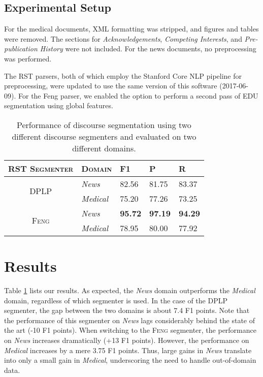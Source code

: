 \subsection{Experimental Setup}
For the medical documents, XML formatting was stripped, and figures and tables were removed. The sections for \textit{Acknowledgements}, \textit{Competing Interests}, and \textit{Pre-publication History} were not included. For the news documents, no preprocessing was performed. 

The RST parsers, both of which employ the Stanford Core NLP pipeline \cite{Manning:2014} for preprocessing, were updated to use the same version of this software (2017-06-09). For the Feng parser, we enabled the option to perform a second pass of EDU segmentation using global features.

\begin{table}[t]
\centering
\begin{tabular}{cllll}
\toprule
\multicolumn{1}{l}{\textsc{RST Segmenter}} & \textsc{Domain}  & \textsc{F1}     & \textsc{P}     & \textsc{R}    \\ \hline \hline
\multirow{2}{*}{\textsc{DPLP}}              & \textit{News}    & 82.56 & 81.75 & 83.37 \\
                                   & \textit{Medical} & 75.20 & 77.26 & 73.25 \\ \hline
\multirow{2}{*}{\textsc{Feng}}              & \textit{News}    & \textbf{95.72} & \textbf{97.19} & \textbf{94.29} \\
                                   & \textit{Medical} & 78.95 &80.00 & 77.92 \\ \bottomrule
\end{tabular}
\caption{Performance of discourse segmentation using two different discourse segmenters and evaluated on two different domains.}
\label{tab:cross_domain_f1}
\end{table}

\section{Results}
Table \ref{tab:cross_domain_f1} lists our results. As expected, the \textit{News} domain outperforms the \textit{Medical} domain, regardless of which segmenter is used. In the case of the \textsc{DPLP} segmenter, the gap between the two domains is about 7.4 F1 points. Note that the performance of this segmenter on \textit{News} lags considerably behind the state of the art (-10 F1 points). When switching to the \textsc{Feng} segmenter, the performance on \textit{News} increases dramatically (+13 F1 points). However, the performance on \textit{Medical} increases by a mere 3.75 F1 points. Thus, large gains in \textit{News} translate into only a small gain in \textit{Medical}, underscoring the need to handle out-of-domain data.

